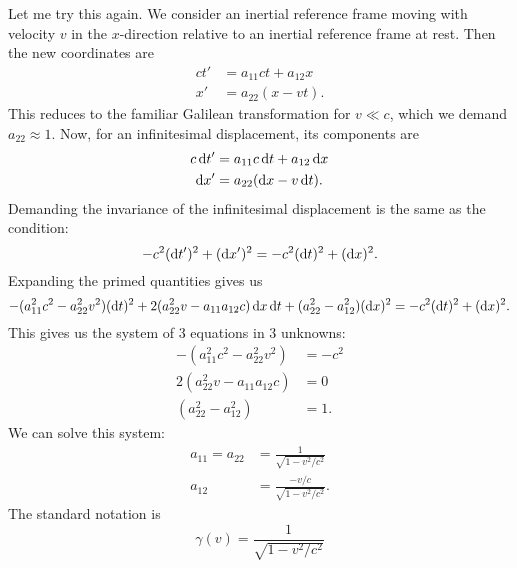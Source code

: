 \M Let me try this again. We consider an inertial reference frame moving
with velocity $v$ in the $x$-direction relative to an inertial reference
frame at rest. Then the new coordinates are
\begin{subequations}
\begin{align}
ct' &= a_{11}ct + a_{12}x\\
x' &= a_{22}(x - vt).
\end{align}
\end{subequations}
This reduces to the familiar Galilean transformation for $v\ll c$, which
we demand $a_{22}\approx 1$. Now, for an infinitesimal displacement, its
components are
\begin{subequations}
\begin{align}
c\,\mathrm{d} t' &= a_{11}c\,\mathrm{d} t + a_{12}\,\mathrm{d} x\\
\mathrm{d} x' &= a_{22}(\mathrm{d} x - v\,\mathrm{d} t).
\end{align}
\end{subequations}
Demanding the invariance of the infinitesimal displacement is the same
as the condition:
\begin{equation}
-c^{2}(\mathrm{d} t')^{2} + (\mathrm{d} x')^{2} =-c^{2}(\mathrm{d} t)^{2} + (\mathrm{d} x)^{2}.
\end{equation}
Expanding the primed quantities gives us
\begin{equation}
-(a_{11}^{2}c^{2} - a_{22}^{2}v^{2})(\mathrm{d} t)^{2}
+ 2 (a_{22}^{2}v - a_{11}a_{12}c)\,\mathrm{d} x\,\mathrm{d} t
+ (a_{22}^{2} - a_{12}^{2})(\mathrm{d} x)^{2} =-c^{2}(\mathrm{d} t)^{2} + (\mathrm{d} x)^{2}.
\end{equation}
This gives us the system of 3 equations in 3 unknowns:
\begin{subequations}
\begin{align}
-(a_{11}^{2}c^{2} - a_{22}^{2}v^{2}) &= -c^{2}\\
2 (a_{22}^{2}v - a_{11}a_{12}c) &= 0\\
(a_{22}^{2} - a_{12}^{2}) &= 1.
\end{align}
\end{subequations}
We can solve this system:
\begin{subequations}
\begin{align}
a_{11} = a_{22} &= \frac{1}{\sqrt{1 - v^{2}/c^{2}}}\\
a_{12} &= \frac{-v/c}{\sqrt{1 - v^{2}/c^{2}}}.
\end{align}
\end{subequations}
The standard notation is
\begin{equation}
\gamma(v) = \frac{1}{\sqrt{1 - v^{2}/c^{2}}}
\end{equation}
